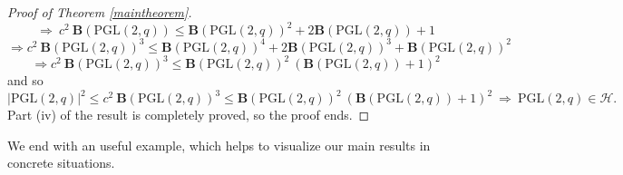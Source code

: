 \documentclass{amsart}
\theoremstyle{definition}
\numberwithin{equation}{section}
\begin{document}
\begin{proof}[Proof of Theorem \ref{maintheorem}]
\begin{equation}
   \Longrightarrow  \  c^2 \  {\mathbf{B}(\mathrm{PGL}(2,q))} \le  {\mathbf{B}(\mathrm{PGL}(2,q))}^2 + 2  {\mathbf{B}(\mathrm{PGL}(2,q))} +1  
   \end{equation}   
\begin{equation}
 \Longrightarrow  c^2  \ \mathbf{B}(\mathrm{PGL}(2,q))^3 \le   {\mathbf{B}(\mathrm{PGL}(2,q))}^4 +  2{ \mathbf{B}(\mathrm{PGL}(2,q))}^3 +    {\mathbf{B}(\mathrm{PGL}(2,q))}^2 
 \end{equation}   
\begin{equation}
 \Longrightarrow  c^2  \ \mathbf{B}(\mathrm{PGL}(2,q))^3 \le   {\mathbf{B}(\mathrm{PGL}(2,q))}^2  \ {( \mathbf{B}(\mathrm{PGL}(2,q))+1)}^2
 \end{equation}   
and so
\begin{equation}
|\mathrm{PGL}(2, q)|^2  \le  c^2  \ \mathbf{B}(\mathrm{PGL}(2,q))^3 \le   {\mathbf{B}(\mathrm{PGL}(2,q))}^2  \ {( \mathbf{B}(\mathrm{PGL}(2,q))+1)}^2   \ \Longrightarrow \ \mathrm{PGL}(2, q) \in \mathcal{H}.
\end{equation}   
Part (iv) of the result is completely proved, so the proof ends.
\end{proof}

We end with an useful example, which helps to visualize our main results in concrete situations.
\end{document}
